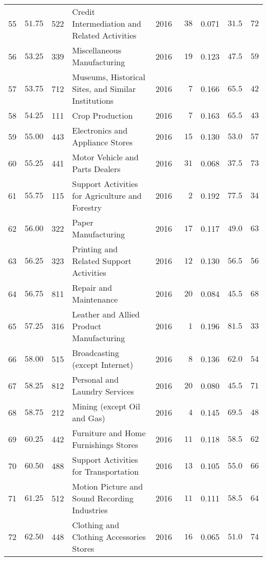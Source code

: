 \documentclass[9pt, oneside]{article}   	%
\begin{document}
\begin{longtable}{lccp{3in}ccccc}
55  & $51.75$ & 522 & Credit Intermediation and Related Activities & 2016 & $\phantom{0}38$ & 0.071 & $31.5$ & $72$ \\
56  & $53.25$ & 339 & Miscellaneous Manufacturing & 2016 & $\phantom{0}19$ & 0.123 & $47.5$ & $59$ \\
57  & $53.75$ & 712 & Museums, Historical Sites, and Similar Institutions & 2016 & $\phantom{00}7$ & 0.166 & $65.5$ & $42$ \\
58  & $54.25$ & 111 & Crop Production & 2016 & $\phantom{00}7$ & 0.163 & $65.5$ & $43$ \\
59  & $55.00$ & 443 & Electronics and Appliance Stores & 2016 & $\phantom{0}15$ & 0.130 & $53.0$ & $57$ \\
60  & $55.25$ & 441 & Motor Vehicle and Parts Dealers & 2016 & $\phantom{0}31$ & 0.068 & $37.5$ & $73$ \\
61  & $55.75$ & 115 & Support Activities for Agriculture and Forestry & 2016 & $\phantom{00}2$ & 0.192 & $77.5$ & $34$ \\
62  & $56.00$ & 322 & Paper Manufacturing & 2016 & $\phantom{0}17$ & 0.117 & $49.0$ & $63$ \\
63  & $56.25$ & 323 & Printing and Related Support Activities & 2016 & $\phantom{0}12$ & 0.130 & $56.5$ & $56$ \\
64  & $56.75$ & 811 & Repair and Maintenance & 2016 & $\phantom{0}20$ & 0.084 & $45.5$ & $68$ \\
65  & $57.25$ & 316 & Leather and Allied Product Manufacturing & 2016 & $\phantom{00}1$ & 0.196 & $81.5$ & $33$ \\
66  & $58.00$ & 515 & Broadcasting (except Internet) & 2016 & $\phantom{00}8$ & 0.136 & $62.0$ & $54$ \\
67  & $58.25$ & 812 & Personal and Laundry Services & 2016 & $\phantom{0}20$ & 0.080 & $45.5$ & $71$ \\
68  & $58.75$ & 212 & Mining (except Oil and Gas) & 2016 & $\phantom{00}4$ & 0.145 & $69.5$ & $48$ \\
69  & $60.25$ & 442 & Furniture and Home Furnishings Stores & 2016 & $\phantom{0}11$ & 0.118 & $58.5$ & $62$ \\
70  & $60.50$ & 488 & Support Activities for Transportation & 2016 & $\phantom{0}13$ & 0.105 & $55.0$ & $66$ \\
71  & $61.25$ & 512 & Motion Picture and Sound Recording Industries & 2016 & $\phantom{0}11$ & 0.111 & $58.5$ & $64$ \\
72  & $62.50$ & 448 & Clothing and Clothing Accessories Stores & 2016 & $\phantom{0}16$ & 0.065 & $51.0$ & $74$ \\

\end{longtable}
\end{document}
